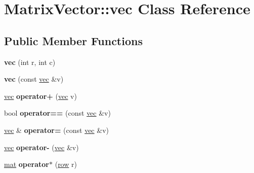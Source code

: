 \hypertarget{class_matrix_vector_1_1vec}{}\section{Matrix\+Vector\+:\+:vec Class Reference}
\label{class_matrix_vector_1_1vec}
\subsection*{Public Member Functions}
\begin{DoxyCompactItemize}
\item 
\mbox{\label{class_matrix_vector_1_1vec_ab6e2a9eafc93e30f80fa55c6c535d390}} 
{\bfseries vec} (int r, int c)
\item 
\mbox{\label{class_matrix_vector_1_1vec_a27d37d91d54816878e65731a1da0b356}} 
{\bfseries vec} (const \mbox{\hyperlink{class_matrix_vector_1_1vec}{vec}} \&v)
\item 
\mbox{\label{class_matrix_vector_1_1vec_a3232c781891c2910d80415afacd6ea98}} 
\mbox{\hyperlink{class_matrix_vector_1_1vec}{vec}} {\bfseries operator+} (\mbox{\hyperlink{class_matrix_vector_1_1vec}{vec}} v)
\item 
\mbox{\label{class_matrix_vector_1_1vec_a9803a34cc3d240ebf094f3769e9fabe9}} 
bool {\bfseries operator==} (const \mbox{\hyperlink{class_matrix_vector_1_1vec}{vec}} \&v)
\item 
\mbox{\label{class_matrix_vector_1_1vec_ac9f996542c421f6c3914895ff01927a5}} 
\mbox{\hyperlink{class_matrix_vector_1_1vec}{vec}} \& {\bfseries operator=} (const \mbox{\hyperlink{class_matrix_vector_1_1vec}{vec}} \&v)
\item 
\mbox{\label{class_matrix_vector_1_1vec_a93520f50fed1ee242f2b2fb295565372}} 
\mbox{\hyperlink{class_matrix_vector_1_1vec}{vec}} {\bfseries operator-\/} (\mbox{\hyperlink{class_matrix_vector_1_1vec}{vec}} \&v)
\item 
\mbox{\label{class_matrix_vector_1_1vec_a48832bec7496fc407aad6130997ff829}} 
\mbox{\hyperlink{class_matrix_vector_1_1mat}{mat}} {\bfseries operator$\ast$} (\mbox{\hyperlink{class_matrix_vector_1_1row}{row}} r)

\end{DoxyCompactItemize}
